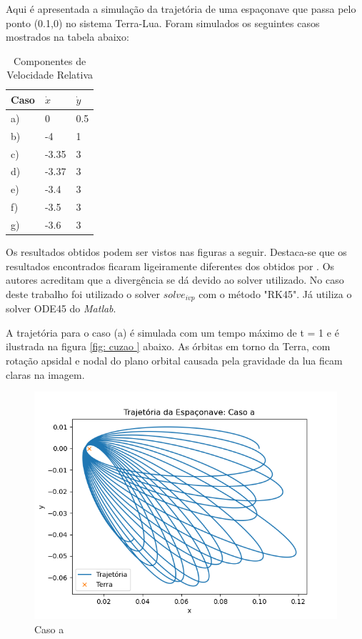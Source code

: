 \par Aqui é apresentada a simulação da trajetória de uma espaçonave que passa pelo ponto (0.1,0) no sistema Terra-Lua. Foram simulados os seguintes casos mostrados na tabela abaixo:

\begin{table}[h]
\centering
\caption{Componentes de Velocidade Relativa}
\label{tab:my-table}
\begin{tabular}{|l|l|l|}
\hline
Caso & $\dot{x}$ & $\dot{y}$ \\ \hline
a)    & 0         & 0.5       \\ \hline
b)    & -4        & 1         \\ \hline
c)    & -3.35     & 3         \\ \hline
d)    & -3.37     & 3         \\ \hline
e)    & -3.4      & 3         \\ \hline
f)    & -3.5      & 3         \\ \hline
g)    & -3.6      & 3         \\ \hline
\end{tabular}
\end{table}


Os resultados obtidos podem ser vistos nas figuras a seguir. Destaca-se que os resultados encontrados ficaram ligeiramente diferentes dos obtidos por \cite{book:226549}. Os autores acreditam que a divergência se dá devido ao solver utilizado. No caso deste trabalho foi utilizado o solver \textit{$solve_{ivp}$} com o método "RK45". Já \cite{book:226549} utiliza o solver ODE45 do \textit{Matlab}.


A trajetória para o caso (a) é simulada com um tempo máximo de t = 1  e é ilustrada na figura \ref{fig: cuzao } abaixo. As órbitas em torno da Terra, com rotação apsidal e nodal do plano orbital causada pela gravidade da lua ficam claras na imagem.

\begin{figure}[H]
\centering
\caption{Caso a}
\label{fig: cuzao}
\includegraphics[width=1\textwidth]{figuras/Resultados/7.3/73casoa.png}
\end{figure}

